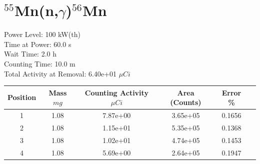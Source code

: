 \newpage

\section*{ $^{55}$Mn(n,$\gamma$)$^{56}$Mn }

Power Level: 100 kW(th) \\
Time at Power: 60.0 s \\
Wait Time:  2.0 h \\
Counting Time: 10.0 m \\
Total Activity at Removal: 6.40e+01 $\mu Ci$

\begin{table}[h]
\centering
\begin{tabular}{ |c|c|c|c|c|c| }
 \hline
 Position & Mass $mg$ & Counting Activity $\mu Ci$ & Area (Counts) & Error \% \\
 \hline 
 1 & 1.08 & 7.87e+00 & 3.65e+05 & 0.1656 \\ 
\hline
 2 & 1.08 & 1.15e+01 & 5.35e+05 & 0.1368 \\ 
\hline
 3 & 1.08 & 1.02e+01 & 4.74e+05 & 0.1453 \\ 
\hline
 4 & 1.08 & 5.69e+00 & 2.64e+05 & 0.1947 \\ 
\hline
\end{tabular}
\end{table}

